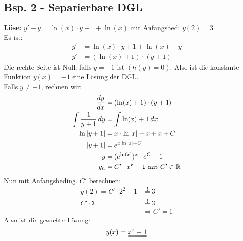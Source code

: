 \subsection{Bsp. 2 - Separierbare DGL}
\textbf{Löse:} $y' - y = \ln(x) \cdot y + 1 + \ln(x)$ mit Anfangsbed: $y(2) = 3$\\
Es ist:
\begin{align*}
	y' &= \ln(x) \cdot y + 1 + \ln(x) + y \\ 
	y' &= (\ln(x) + 1) \cdot (y + 1)
\end{align*}
Die rechte Seite ist Null, falls $y = -1$ ist $(h(y) = 0)$. Also ist die konstante Funktion $y(x) = -1$ eine Lösung der DGL.\\ Falls $y \neq -1$, rechnen wir:
\begin{align*}
	\frac{dy}{dx} &= (\ln(x) + 1) \cdot (y + 1) \\
	\int \frac{1}{y + 1} \, dy &= \int \ln(x) + 1 \; dx\\
	\ln|y + 1| &= x \cdot \ln|x| - x + x + C \\
	|y + 1| &= e^{x \ln|x| + C} \\
	y &= (e^{\ln(x)})^x \cdot e^C - 1\\
	y_h &= C' \cdot x^x -1 \text{ mit } C' \in \mathbb{R}
\end{align*}
Nun mit Anfangsbeding. $C'$ berechnen:
\begin{align*}
	y(2) = C' \cdot 2^2 -1 &\overset{!}{=} 3 \\
	C' \cdot 3 &\overset{!}{=} 3 \\
	&\Rightarrow C' = 1
\end{align*}
Also ist die gesuchte Lösung:
\[
	y(x) = \uuline{x^x -1}
\]
\pagebreak

